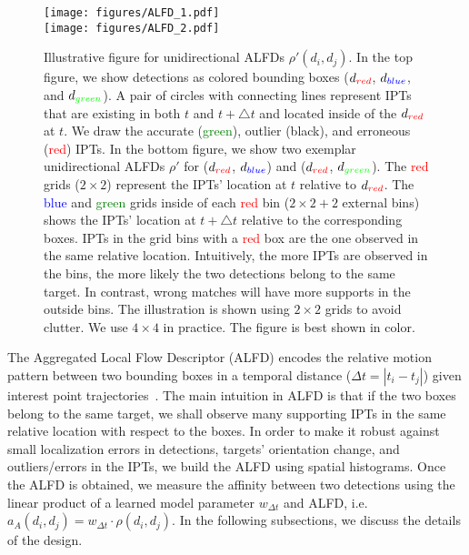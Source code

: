 \documentclass[10pt,twocolumn,letterpaper]{article}
\begin{document}
\begin{figure}
\begin{center}
\texttt{[image: figures/ALFD\_1.pdf]}\\
\texttt{[image: figures/ALFD\_2.pdf]}\\
\end{center}
\caption{Illustrative figure for unidirectional ALFDs $\rho'(d_i, d_j)$. In the top figure, we show detections as colored bounding boxes ($d_{\textcolor{red}{red}}$, $d_{\textcolor{blue}{blue}}$, and $d_{\textcolor{green}{green}}$). A pair of circles with connecting lines represent IPTs that are existing in both $t$ and $t + \triangle t$ and located inside of the $d_{\textcolor{red}{red}}$ at $t$. We draw the accurate (\textcolor{green}{green}), outlier (black), and erroneous (\textcolor{red}{red}) IPTs. In the bottom figure, we show two exemplar unidirectional ALFDs $\rho'$ for ($d_{\textcolor{red}{red}}$, $d_{\textcolor{blue}{blue}}$) and ($d_{\textcolor{red}{red}}$, $d_{\textcolor{green}{green}}$). The \textcolor{red}{red} grids ($2\times2$) represent the IPTs' location at $t$ relative to $d_{\textcolor{red}{red}}$. The \textcolor{blue}{blue} and \textcolor{green}{green} grids inside of each \textcolor{red}{red} bin ($2\times2 + 2$ external bins) shows the IPTs' location at $t+\triangle t$ relative to the corresponding boxes. IPTs in the grid bins with a \textcolor{red}{red} box are the one observed in the same relative location. Intuitively, the more IPTs are observed in the bins, the more likely the two detections belong to the same target. In contrast, wrong matches will have more supports in the outside bins. The illustration is shown using $2\times2$ grids to avoid clutter. We use $4\times4$ in practice. The figure is best shown in color.}
\label{fig:ALFDV2}
\end{figure}

The Aggregated Local Flow Descriptor (ALFD) encodes the relative motion pattern between two bounding boxes in a temporal distance ($\Delta t=|t_i-t_j|$) given interest point trajectories~\cite{Tomasi_CMUTR_91}. The main intuition in ALFD is that if the two boxes belong to the same target, we shall observe many supporting IPTs in the same relative location with respect to the boxes. In order to make it robust against small localization errors in detections, targets' orientation change, and outliers/errors in the IPTs, we build the ALFD using spatial histograms. Once the ALFD is obtained, we measure the affinity between two detections using the linear product of a learned model parameter $w_{\Delta t}$ and ALFD, i.e. $a_{A}(d_i, d_j) = w_{\Delta t} \cdot \rho(d_i, d_j)$. In the following subsections, we discuss the details of the design.
\end{document}
